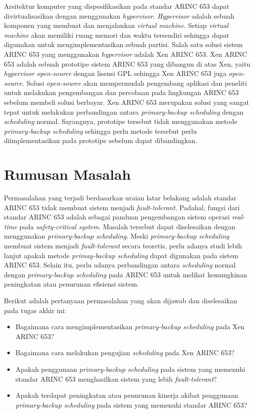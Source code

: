 Arsitektur komputer yang dispesifikasikan pada standar ARINC 653 dapat divirtualisasikan dengan menggunakan \textit{hypervisor}.
\textit{Hypervisor} adalah sebuah komponen yang membuat dan menjalankan \textit{virtual machine}.
Setiap \textit{virtual machine} akan memiliki ruang memori dan waktu tersendiri sehingga dapat digunakan untuk mengimplementasikan sebuah partisi.
Salah satu solusi sistem ARINC 653 yang menggunakan \textit{hypervisor} adalah Xen ARINC 653.
Xen ARINC 653 adalah sebuah prototipe sistem ARINC 653 yang dibangun di atas Xen, yaitu \textit{hypervisor} \textit{open-source} dengan lisensi GPL sehingga Xen ARINC 653 juga \textit{open-source}.
Solusi \textit{open-source} akan mempermudah pengembang aplikasi dan peneliti untuk melakukan pengembangan dan percobaan pada lingkungan ARINC 653 sebelum membeli solusi berbayar.
Xen ARINC 653 merupakan solusi yang sangat tepat untuk melakukan perbandingan antara \textit{primary-backup scheduling} dengan \textit{scheduling} normal.
Sayangnya, prototipe tersebut tidak menggunakan metode \textit{primary-backup scheduling} sehingga perlu metode tersebut perlu diimplementasikan pada prototipe sebelum dapat dibandingkan.

\section{Rumusan Masalah}

Permasalahan yang terjadi berdasarkan uraian latar belakang adalah standar ARINC 653 tidak membuat sistem menjadi \textit{fault-tolerant}.
Padahal, fungsi dari standar ARINC 653 adalah sebagai panduan pengembangan sistem operasi \textit{real-time} pada \textit{safety-critical system}.
Masalah tersebut dapat diselesaikan dengan menggunakan \textit{primary-backup scheduling}.
Meski \textit{primary-backup scheduling} membuat sistem menjadi \textit{fault-tolerant} secara teoretis, perlu adanya studi lebih lanjut apakah metode \textit{primay-backup scheduling} dapat digunakan pada sistem ARINC 653.
Selain itu, perlu adanya perbandingan antara \textit{scheduling} normal dengan \textit{primary-backup scheduling} pada ARINC 653 untuk melihat kemungkinan peningkatan atau penurunan efisiensi sistem.

Berikut adalah pertanyaan permasalahan yang akan dijawab dan diselesaikan pada tugas akhir ini:

\begin{itemize}
    \item Bagaimana cara mengimplementasikan \textit{primary-backup scheduling} pada Xen ARINC 653?
    \item Bagaimana cara melakukan pengujian \textit{scheduling} pada Xen ARINC 653?
    \item Apakah penggunaan \textit{primary-backup scheduling} pada sistem yang memenuhi standar ARINC 653 menghasilkan sistem yang lebih \textit{fault-tolerant}?
    \item Apakah terdapat peningkatan atau penurunan kinerja akibat penggunaan \textit{primary-backup scheduling} pada sistem yang memenuhi standar ARINC 653?
\end{itemize}


